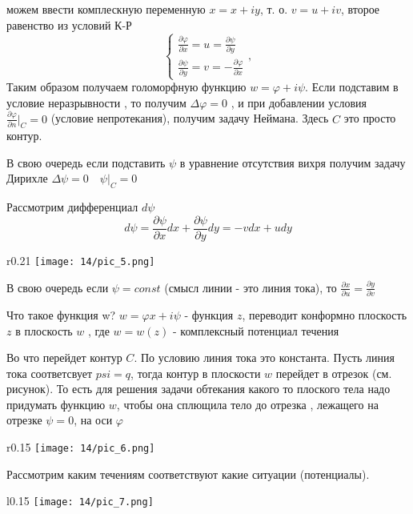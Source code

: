 можем ввести комплескную переменную $x = x + i y$, т. о. $v = u + iv$, второе равенство из условий К-Р
$$ \begin{cases}
	\frac{\partial \varphi}{\partial x} = u  = \frac{\partial \psi}{\partial y}\\
	\frac{\partial \psi}{\partial y} = v = -\frac{\partial \varphi}{\partial x} 
\end{cases},$$
Таким образом получаем голоморфную функцию $w = \varphi + i \psi$. Если подставим в условие неразрывности , то получим $\Delta \varphi = 0$ , и при добавлении условия $\frac{\partial \varphi}{\partial n} |_C = 0 $ (условие непротекания), получим задачу Неймана. Здесь $C$ это просто контур.

В свою очередь если подставить $\psi $ в уравнение отсутствия вихря получим задачу Дирихле
$ \Delta \psi = 0 \quad \psi |_C = 0$



Рассмотрим дифференциал $d \psi$
$$
d \psi = \frac{\partial \psi}{\partial x}  dx +  \frac{\partial \psi}{\partial y}  dy = -vdx + udy
$$
\begin{wrapfigure}{r}{0.21\textwidth}
	\texttt{[image: 14/pic\_5.png]}
	\caption{\label{ris:image14.5}}
\end{wrapfigure}
В свою очередь если $\psi = const $ (смысл линии - это линия тока), то $\frac{\partial x}{\partial u} = \frac{\partial y}{\partial v} $


Что такое функция w? $w = \varphi x + i \psi$ - функция $z$, переводит конформно плоскость $z$ в плоскость $w$ , где $w=w(z)$ - комплексный потенциал течения

Во что перейдет контур $C$. По условию линия тока это константа. Пусть линия тока соответсвует $psi = q$, тогда контур в плоскости $w$ перейдет в отрезок (см. рисунок). То есть для решения задачи обтекания какого то плоского тела надо придумать функцию $w$, чтобы она сплющила тело до отрезка , лежащего на отрезке $\psi = 0$, на оси $\varphi$
$$$$
\newpage 

\begin{wrapfigure}{r}{0.15\textwidth}
	\texttt{[image: 14/pic\_6.png]}
	\caption{\label{ris:image14.6}}
\end{wrapfigure}



Рассмотрим каким течениям соответствуют какие  ситуации (потенциалы).

\begin{wrapfigure}{l}{0.15\textwidth}
	\texttt{[image: 14/pic\_7.png]}
	\caption{\label{ris:image14.7}}
\end{wrapfigure}

